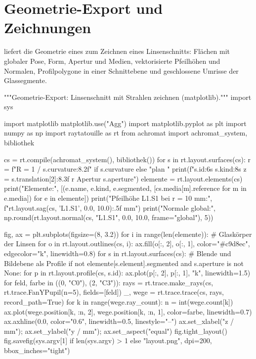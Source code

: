 \documentclass[11pt,a4paper,openany]{book}
\DeclareRobustCommand{\code}[1]{\texttt{\directlua{rttcode("\luaescapestring{\detokenize{#1}}")}}}
\begin{document}
\chapter{Geometrie-Export und Zeichnungen}
\label{chap:layout}

\code{rt.layout} liefert die Geometrie eines \code{CompiledSystem} zum Zeichnen eines
Linsenschnitts: Flächen mit globaler Pose, Form, Apertur und Medien, vektorisierte Pfeilhöhen
und Normalen, Profilpolygone in einer Schnittebene und geschlossene Umrisse der Glassegmente.

\begin{pycode}[title={\code{ex15_layout.py}}]
"""Geometrie-Export: Linsenschnitt mit Strahlen zeichnen (matplotlib)."""
import sys

import matplotlib
matplotlib.use("Agg")
import matplotlib.pyplot as plt
import numpy as np
import raytatouille as rt
from achromat import achromat_system, bibliothek

cs = rt.compile(achromat_system(), bibliothek())
for s in rt.layout.surfaces(cs):
    r = f"R = {1 / s.curvature:8.2f}" if s.curvature else "plan      "
    print(f"{s.id:6s} {s.kind:8s} z = {s.translation[2]:8.3f}  {r}  Apertur {s.aperture}")
elemente = rt.layout.elements(cs)
print("Elemente:", [(e.name, e.kind, e.segmented, [cs.media[m].reference for m in e.media])
                    for e in elemente])
print("Pfeilhöhe L1.S1 bei r = 10 mm:", f"{rt.layout.sag(cs, 'L1.S1', 0.0, 10.0):.5f} mm")
print("Normale global:", np.round(rt.layout.normal(cs, "L1.S1", 0.0, 10.0, frame="global"), 5))

fig, ax = plt.subplots(figsize=(8, 3.2))
for i in range(len(elemente)):                         # Glaskörper der Linsen
    for o in rt.layout.outlines(cs, i):
        ax.fill(o[:, 2], o[:, 1], color="#c9d8ec", edgecolor="k", linewidth=0.8)
for s in rt.layout.surfaces(cs):                       # Blende und Bildebene als Profile
    if not elemente[s.element].segmented and s.aperture is not None:
        for p in rt.layout.profile(cs, s.id):
            ax.plot(p[:, 2], p[:, 1], "k", linewidth=1.5)
for feld, farbe in ((0, "C0"), (2, "C3")):
    rays = rt.trace.make_rays(cs, rt.trace.FanYPupil(n=5), fields=[feld])
    _, wege = rt.trace.trace(cs, rays, record_path=True)
    for k in range(wege.ray_count):
        n = int(wege.count[k])
        ax.plot(wege.position[k, :n, 2], wege.position[k, :n, 1], color=farbe, linewidth=0.7)
ax.axhline(0.0, color="0.6", linewidth=0.5, linestyle="--")
ax.set_xlabel("z / mm"); ax.set_ylabel("y / mm"); ax.set_aspect("equal")
fig.tight_layout()
fig.savefig(sys.argv[1] if len(sys.argv) > 1 else "layout.png", dpi=200, bbox_inches="tight")
\end{pycode}
\end{document}
